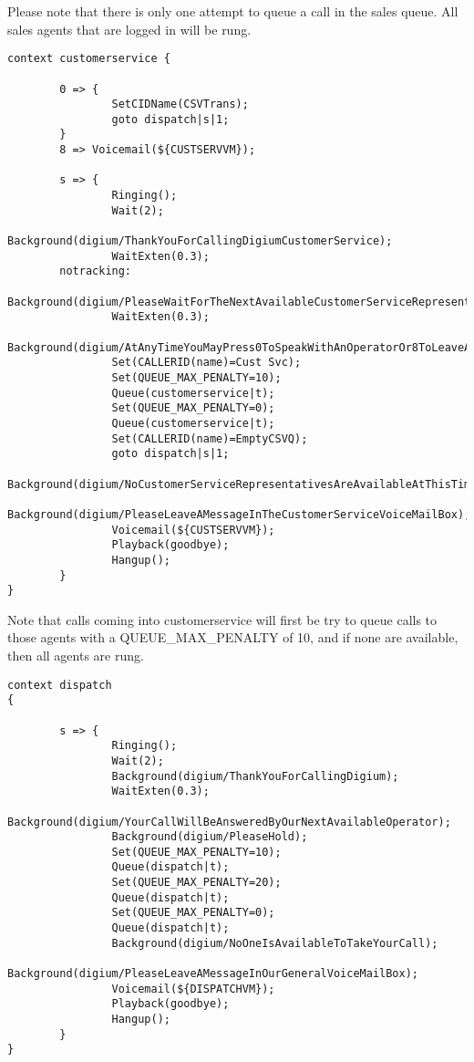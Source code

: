 Please note that there is only one attempt to queue a call in the sales queue. All sales agents that
are logged in will be rung.

\begin{verbatim}
context customerservice {

        0 => {
                SetCIDName(CSVTrans);
                goto dispatch|s|1;
        }
        8 => Voicemail(${CUSTSERVVM});

        s => {
                Ringing();
                Wait(2);
                Background(digium/ThankYouForCallingDigiumCustomerService);
                WaitExten(0.3);
        notracking:
                Background(digium/PleaseWaitForTheNextAvailableCustomerServiceRepresentative);
                WaitExten(0.3);
                Background(digium/AtAnyTimeYouMayPress0ToSpeakWithAnOperatorOr8ToLeaveAMessage);
                Set(CALLERID(name)=Cust Svc);
                Set(QUEUE_MAX_PENALTY=10);
                Queue(customerservice|t);
                Set(QUEUE_MAX_PENALTY=0);
                Queue(customerservice|t);
                Set(CALLERID(name)=EmptyCSVQ);
                goto dispatch|s|1;
                Background(digium/NoCustomerServiceRepresentativesAreAvailableAtThisTime);
                Background(digium/PleaseLeaveAMessageInTheCustomerServiceVoiceMailBox);
                Voicemail(${CUSTSERVVM});
                Playback(goodbye);
                Hangup();
        }
}
\end{verbatim}

Note that calls coming into customerservice will first be try to queue
calls to those agents with a QUEUE\_MAX\_PENALTY of 10, and if none are available,
then all agents are rung.

\begin{verbatim}
context dispatch
{

        s => {
                Ringing();
                Wait(2);
                Background(digium/ThankYouForCallingDigium);
                WaitExten(0.3);
                Background(digium/YourCallWillBeAnsweredByOurNextAvailableOperator);
                Background(digium/PleaseHold);
                Set(QUEUE_MAX_PENALTY=10);
                Queue(dispatch|t);
                Set(QUEUE_MAX_PENALTY=20);
                Queue(dispatch|t);
                Set(QUEUE_MAX_PENALTY=0);
                Queue(dispatch|t);
                Background(digium/NoOneIsAvailableToTakeYourCall);
                Background(digium/PleaseLeaveAMessageInOurGeneralVoiceMailBox);
                Voicemail(${DISPATCHVM});
                Playback(goodbye);
                Hangup();
        }
}
\end{verbatim}

